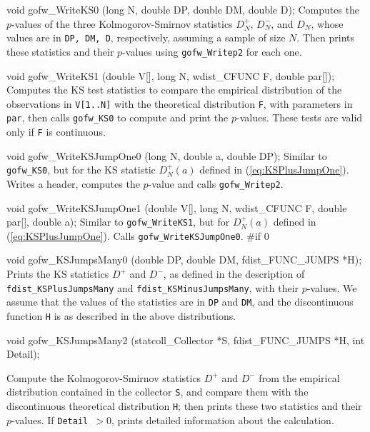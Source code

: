 void gofw_WriteKS0 (long N, double DP, double DM, double D);
\endcode
\tab  Computes the $p$-values of the three Kolmogorov-Smirnov statistics
  $D_N^+$, $D_N^-$, and $D_N$, whose values are in {\tt DP, DM, D},
  respectively, assuming a sample of size $N$.
  Then prints these statistics and their $p$-values
  using {\tt gofw\_Writep2} for each one.
\endtab
\code


void gofw_WriteKS1 (double V[], long N, wdist_CFUNC F, double par[]);
\endcode
\tab Computes the KS test statistics to compare the
 empirical distribution of the observations in {\tt V[1..N]}
 with the theoretical distribution {\tt F}, with parameters in {\tt par},
 then calls {\tt gofw\_KS0} to compute and print the $p$-values.
 These tests are valid only if {\tt F} is continuous.
\endtab
\code


void gofw_WriteKSJumpOne0 (long N, double a, double DP);
\endcode
\tab  Similar to {\tt gofw\_KS0}, but for the KS statistic $D_N^+(a)$
  defined in (\ref{eq:KSPlusJumpOne}).  Writes a header,
  computes the $p$-value and calls {\tt gofw\_Writep2}.
\endtab
\code


void gofw_WriteKSJumpOne1 (double V[], long N,
                           wdist_CFUNC F, double par[], double a);
\endcode
\tab Similar to {\tt gofw\_WriteKS1}, but for $D_N^+(a)$
  defined in (\ref{eq:KSPlusJumpOne}).
  Calls {\tt gofw\_WriteKSJumpOne0}.
\endtab
\iffalse %
\code
#if 0

void gofw_KSJumpsMany0 (double DP, double DM, fdist_FUNC_JUMPS *H);
\endcode
\tab
  Prints the KS  statistics  $D^+$ and $D^-$, as defined in the
  description of {\tt fdist\_KSPlusJumpsMany} and
  {\tt fdist\_KSMinusJumpsMany}, with their $p$-values.
  We assume that the values of the statistics are in {\tt DP} and {\tt DM},
  and the discontinuous function {\tt H} is as described in the
  above distributions.
\endtab
\code


void gofw_KSJumpsMany2 (statcoll_Collector *S, fdist_FUNC_JUMPS *H,
                        int Detail);

\endcode
\tab
 Compute the Kolmogorov-Smirnov statistics  $D^+$ and $D^-$
 from the empirical distribution contained in the collector  {\tt S},
  and  compare them with the discontinuous theoretical distribution
 {\tt H}; then prints these two statistics and their $p$-values.
 If  {\tt Detail $> 0$}, prints detailed information
 about the calculation.
\endtab
\code

